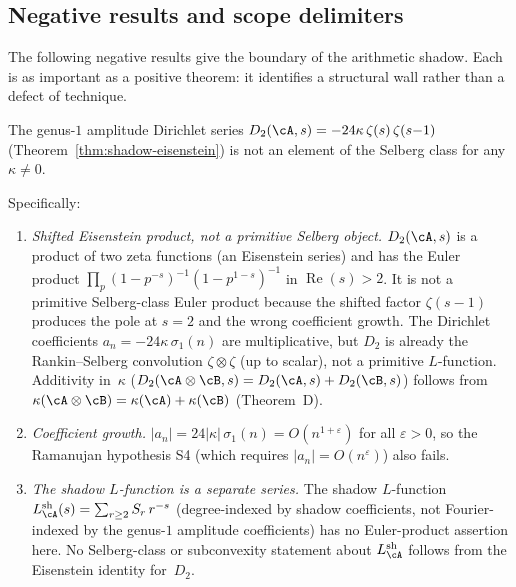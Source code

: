 \subsection{Negative results and scope delimiters}
\label{subsec:negative-results}

The following negative results give the boundary of the arithmetic
shadow. Each is as important as a positive theorem: it identifies a
structural wall rather than a defect of technique.

\begin{proposition}
\label{prop:shadow-not-selberg}
\ClaimStatusProvedHere
{}
The genus-$1$ amplitude Dirichlet series
$D_2(\cA,s) = -24\kappa\,\zeta(s)\,\zeta(s{-}1)$
\textup{(}Theorem~\textup{\ref{thm:shadow-eisenstein}}\textup{)}
is not an element of the Selberg class for any
$\kappa\neq0$.

Specifically:
\begin{enumerate}[label=\textup{(\roman*)}]
\item \emph{Shifted Eisenstein product, not a primitive Selberg
object.}
 $D_2(\cA,s)$ is a product of two zeta functions
 \textup{(}an Eisenstein series\textup{)} and has the Euler product
 $\prod_p(1-p^{-s})^{-1}(1-p^{1-s})^{-1}$ in
 $\operatorname{Re}(s)>2$. It is not a primitive Selberg-class
 Euler product because the shifted factor $\zeta(s-1)$ produces the
 pole at $s=2$ and the wrong coefficient growth. The Dirichlet coefficients
 $a_n = -24\kappa\,\sigma_1(n)$ are multiplicative, but
 $D_2$ is already the Rankin--Selberg
 convolution $\zeta \otimes \zeta$ (up to scalar), not a
 primitive $L$-function. Additivity in~$\kappa$
 ($D_2(\cA \otimes \cB, s)
 = D_2(\cA, s) + D_2(\cB, s)$)
 follows from $\kappa(\cA \otimes \cB)
 = \kappa(\cA) + \kappa(\cB)$
 \textup{(}Theorem~D\textup{)}.
\item \emph{Coefficient growth.}
 $|a_n| = 24|\kappa|\,\sigma_1(n) = O(n^{1+\varepsilon})$ for
 all $\varepsilon > 0$, so the Ramanujan hypothesis S4
 \textup{(}which requires $|a_n| = O(n^\varepsilon)$\textup{)}
 also fails.
\item \emph{The shadow $L$-function is a separate series.}
The shadow $L$-function
$L_\cA^{\mathrm{sh}}(s) = \sum_{r \ge 2} S_r\,r^{-s}$
\textup{(}degree-indexed by shadow coefficients, not
Fourier-indexed by the genus-$1$ amplitude coefficients\textup{)}
has no Euler-product assertion here. No Selberg-class or
subconvexity statement about $L_\cA^{\mathrm{sh}}$ follows from the
Eisenstein identity for~$D_2$.
\end{enumerate}
\end{proposition}

